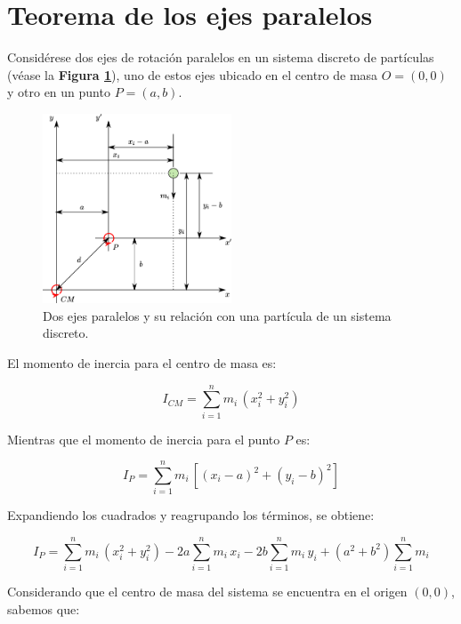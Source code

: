 \documentclass[letter,oneside,11pt]{article}
\begin{document}
\section{Teorema de los ejes paralelos \cite{Sears}}

Considérese dos ejes de rotación paralelos en un sistema discreto de partículas
(véase la \textbf{Figura \ref{figura5}}), uno de estos ejes ubicado en el centro
de masa $O = (0,0)$ y otro en un punto $P = (a,b)$.

\begin{figure}
\centering
\includegraphics[width=0.50\textwidth]{resources/f5.eps}
\caption{Dos ejes paralelos y su relación con una partícula de un sistema discreto.}
\label{figura5}
\end{figure}

El momento de inercia para el centro de masa es:

\begin{equation*}
    I_{CM} = \sum_{i=1}^{n} m_i\, (x^2_i + y^2_i)
\end{equation*}

Mientras que el momento de inercia  para el punto $P$ es:

\begin{equation*}
    I_{P} = \sum_{i=1}^{n} m_i\, [ (x_i-a)^2 + (y_i-b)^2 ]
\end{equation*}

Expandiendo los cuadrados y reagrupando los términos, se obtiene:

\begin{equation*}
    I_{P} = \sum_{i=1}^{n} m_i\, (x^2_i + y^2_i) - 2a \sum_{i=1}^{n} m_i\, x_i - 2b \sum_{i=1}^{n} m_i\, y_i + (a^2 + b^2) \sum_{i=1}^{n} m_i
\end{equation*}

Considerando que el centro de masa del sistema se encuentra en el origen
$(0,0)$, sabemos que:
\end{document}
